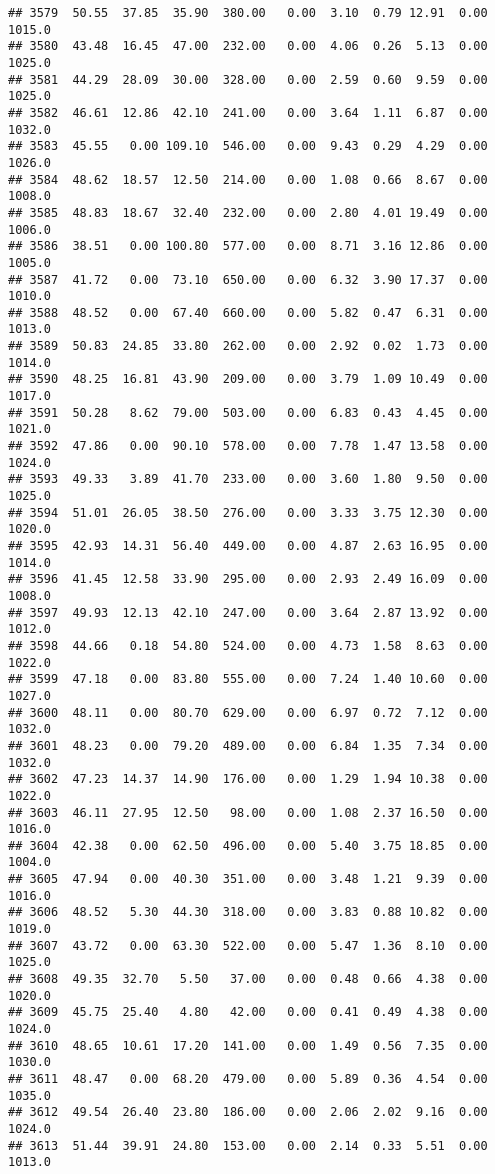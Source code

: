 \documentclass{article}\usepackage{graphicx, color}
\makeatletter
\newenvironment{kframe}{%
 \def\at@end@of@kframe{}%
 \ifinner\ifhmode%
  \def\at@end@of@kframe{\end{minipage}}%
  \begin{minipage}{\columnwidth}%
 \fi\fi%
 \def\FrameCommand##1{\hskip\@totalleftmargin \hskip-\fboxsep
 \colorbox{shadecolor}{##1}\hskip-\fboxsep
     \hskip-\linewidth \hskip-\@totalleftmargin \hskip\columnwidth}%
 \MakeFramed {\advance\hsize-\width
   \@totalleftmargin\z@ \linewidth\hsize
   \@setminipage}}%
 {\par\unskip\endMakeFramed%
 \at@end@of@kframe}
\newenvironment{knitrout}{}{} %
\makeatother
\begin{document}
\begin{knitrout}
\begin{kframe}
\begin{verbatim}
## 3579  50.55  37.85  35.90  380.00   0.00  3.10  0.79 12.91  0.00 1015.0
## 3580  43.48  16.45  47.00  232.00   0.00  4.06  0.26  5.13  0.00 1025.0
## 3581  44.29  28.09  30.00  328.00   0.00  2.59  0.60  9.59  0.00 1025.0
## 3582  46.61  12.86  42.10  241.00   0.00  3.64  1.11  6.87  0.00 1032.0
## 3583  45.55   0.00 109.10  546.00   0.00  9.43  0.29  4.29  0.00 1026.0
## 3584  48.62  18.57  12.50  214.00   0.00  1.08  0.66  8.67  0.00 1008.0
## 3585  48.83  18.67  32.40  232.00   0.00  2.80  4.01 19.49  0.00 1006.0
## 3586  38.51   0.00 100.80  577.00   0.00  8.71  3.16 12.86  0.00 1005.0
## 3587  41.72   0.00  73.10  650.00   0.00  6.32  3.90 17.37  0.00 1010.0
## 3588  48.52   0.00  67.40  660.00   0.00  5.82  0.47  6.31  0.00 1013.0
## 3589  50.83  24.85  33.80  262.00   0.00  2.92  0.02  1.73  0.00 1014.0
## 3590  48.25  16.81  43.90  209.00   0.00  3.79  1.09 10.49  0.00 1017.0
## 3591  50.28   8.62  79.00  503.00   0.00  6.83  0.43  4.45  0.00 1021.0
## 3592  47.86   0.00  90.10  578.00   0.00  7.78  1.47 13.58  0.00 1024.0
## 3593  49.33   3.89  41.70  233.00   0.00  3.60  1.80  9.50  0.00 1025.0
## 3594  51.01  26.05  38.50  276.00   0.00  3.33  3.75 12.30  0.00 1020.0
## 3595  42.93  14.31  56.40  449.00   0.00  4.87  2.63 16.95  0.00 1014.0
## 3596  41.45  12.58  33.90  295.00   0.00  2.93  2.49 16.09  0.00 1008.0
## 3597  49.93  12.13  42.10  247.00   0.00  3.64  2.87 13.92  0.00 1012.0
## 3598  44.66   0.18  54.80  524.00   0.00  4.73  1.58  8.63  0.00 1022.0
## 3599  47.18   0.00  83.80  555.00   0.00  7.24  1.40 10.60  0.00 1027.0
## 3600  48.11   0.00  80.70  629.00   0.00  6.97  0.72  7.12  0.00 1032.0
## 3601  48.23   0.00  79.20  489.00   0.00  6.84  1.35  7.34  0.00 1032.0
## 3602  47.23  14.37  14.90  176.00   0.00  1.29  1.94 10.38  0.00 1022.0
## 3603  46.11  27.95  12.50   98.00   0.00  1.08  2.37 16.50  0.00 1016.0
## 3604  42.38   0.00  62.50  496.00   0.00  5.40  3.75 18.85  0.00 1004.0
## 3605  47.94   0.00  40.30  351.00   0.00  3.48  1.21  9.39  0.00 1016.0
## 3606  48.52   5.30  44.30  318.00   0.00  3.83  0.88 10.82  0.00 1019.0
## 3607  43.72   0.00  63.30  522.00   0.00  5.47  1.36  8.10  0.00 1025.0
## 3608  49.35  32.70   5.50   37.00   0.00  0.48  0.66  4.38  0.00 1020.0
## 3609  45.75  25.40   4.80   42.00   0.00  0.41  0.49  4.38  0.00 1024.0
## 3610  48.65  10.61  17.20  141.00   0.00  1.49  0.56  7.35  0.00 1030.0
## 3611  48.47   0.00  68.20  479.00   0.00  5.89  0.36  4.54  0.00 1035.0
## 3612  49.54  26.40  23.80  186.00   0.00  2.06  2.02  9.16  0.00 1024.0
## 3613  51.44  39.91  24.80  153.00   0.00  2.14  0.33  5.51  0.00 1013.0

\end{verbatim}
\end{kframe}
\end{knitrout}
\end{document}
